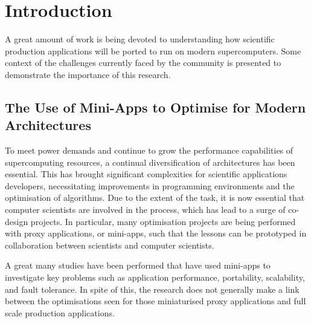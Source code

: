 \documentclass[runningheads,a4paper]{llncs}
\begin{document}
\section{Introduction}

A great amount of work is being devoted to understanding how scientific production applications will be ported to run on modern supercomputers. Some context of the challenges currently faced by the community is presented to demonstrate the importance of this research. 

\subsection{The Use of Mini-Apps to Optimise for Modern Architectures}

To meet power demands and continue to grow the performance capabilities of supercomputing resources, a continual diversification of architectures has been essential. This has brought significant complexities for scientific applications developers, necessitating improvements in programming environments and the optimisation of algorithms. Due to the extent of the task, it is now essential that computer scientists are involved in the process, which has lead to a surge of co-design projects. In particular, many optimisation projects are being performed with proxy applications, or mini-apps, such that the lessons can be prototyped in collaboration between scientists and computer scientists.

A great many studies have been performed that have used mini-apps to investigate key problems such as application performance, portability, scalability, and fault tolerance. In spite of this, the research does not generally make a link between the optimisations seen for those miniaturised proxy applications and full scale production applications.

\end{document}
